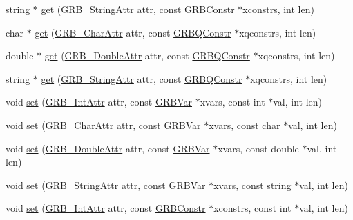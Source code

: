 \begin{DoxyCompactItemize}
\item 
string $\ast$ \hyperlink{classGRBModel_a0478e3e64996775c023038059cdf19a1}{get} (\hyperlink{gurobi__c_09_09_8h_a08ffa110d9b1684d689ae53300bb7ec1}{G\+R\+B\+\_\+\+String\+Attr} attr, const \hyperlink{classGRBConstr}{G\+R\+B\+Constr} $\ast$xconstrs, int len)
\item 
char $\ast$ \hyperlink{classGRBModel_a4974083812ee67881c9052f7cac7ca2f}{get} (\hyperlink{gurobi__c_09_09_8h_a590e6aa44289cb0563eb6a382794dace}{G\+R\+B\+\_\+\+Char\+Attr} attr, const \hyperlink{classGRBQConstr}{G\+R\+B\+Q\+Constr} $\ast$xqconstrs, int len)
\item 
double $\ast$ \hyperlink{classGRBModel_a3664633bfe524de118f432bc011b61ed}{get} (\hyperlink{gurobi__c_09_09_8h_a2f43cc28447ce1778973a1f7961e8180}{G\+R\+B\+\_\+\+Double\+Attr} attr, const \hyperlink{classGRBQConstr}{G\+R\+B\+Q\+Constr} $\ast$xqconstrs, int len)
\item 
string $\ast$ \hyperlink{classGRBModel_abdac5cb1ebe0e610216fc255ec521c7e}{get} (\hyperlink{gurobi__c_09_09_8h_a08ffa110d9b1684d689ae53300bb7ec1}{G\+R\+B\+\_\+\+String\+Attr} attr, const \hyperlink{classGRBQConstr}{G\+R\+B\+Q\+Constr} $\ast$xqconstrs, int len)
\item 
void \hyperlink{classGRBModel_a45636b2c5aed29cf096eb65cafa656a8}{set} (\hyperlink{gurobi__c_09_09_8h_acfc136f6822be3d3e36ac84bd76b0900}{G\+R\+B\+\_\+\+Int\+Attr} attr, const \hyperlink{classGRBVar}{G\+R\+B\+Var} $\ast$xvars, const int $\ast$val, int len)
\item 
void \hyperlink{classGRBModel_afd103bc2bfefc1bcf2ac3840d5863c7b}{set} (\hyperlink{gurobi__c_09_09_8h_a590e6aa44289cb0563eb6a382794dace}{G\+R\+B\+\_\+\+Char\+Attr} attr, const \hyperlink{classGRBVar}{G\+R\+B\+Var} $\ast$xvars, const char $\ast$val, int len)
\item 
void \hyperlink{classGRBModel_acd3dde73f8f2d44bb21454069bbaa2a5}{set} (\hyperlink{gurobi__c_09_09_8h_a2f43cc28447ce1778973a1f7961e8180}{G\+R\+B\+\_\+\+Double\+Attr} attr, const \hyperlink{classGRBVar}{G\+R\+B\+Var} $\ast$xvars, const double $\ast$val, int len)
\item 
void \hyperlink{classGRBModel_af88c5e400af5f8e86e088633e3bc97c5}{set} (\hyperlink{gurobi__c_09_09_8h_a08ffa110d9b1684d689ae53300bb7ec1}{G\+R\+B\+\_\+\+String\+Attr} attr, const \hyperlink{classGRBVar}{G\+R\+B\+Var} $\ast$xvars, const string $\ast$val, int len)
\item 
void \hyperlink{classGRBModel_a5ebf4f2bfd9dc58740c3cb1cf3a97e61}{set} (\hyperlink{gurobi__c_09_09_8h_acfc136f6822be3d3e36ac84bd76b0900}{G\+R\+B\+\_\+\+Int\+Attr} attr, const \hyperlink{classGRBConstr}{G\+R\+B\+Constr} $\ast$xconstrs, const int $\ast$val, int len)

\end{DoxyCompactItemize}
